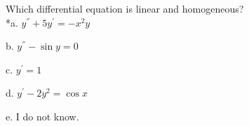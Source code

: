 
Which differential equation is linear and homogeneous? \\


*a. \( y^{''} + 5y^{'} = - x^{2}y \)

b. \( y^{''} - \sin y = 0 \)

c. \( y^{'} = 1 \)

d. \( y^{'} - 2y^{2} = \cos x \)

e. I do not know. \\
